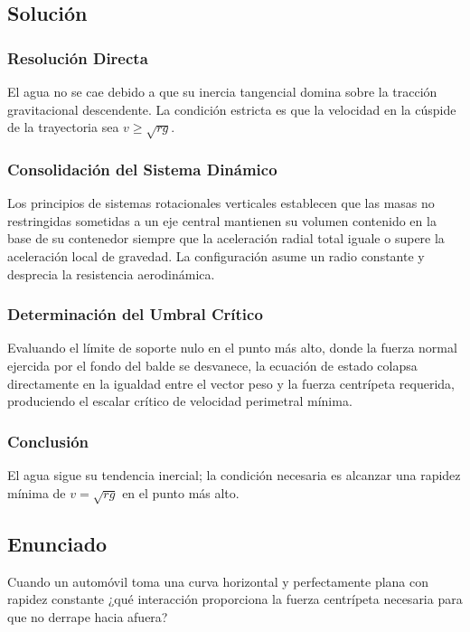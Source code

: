 \documentclass{article}
\begin{document}
\subsection*{Solución}

\subsubsection*{Resolución Directa}
El agua no se cae debido a que su inercia tangencial domina sobre la tracción gravitacional descendente. La condición estricta es que la velocidad en la cúspide de la trayectoria sea $v \geq \sqrt{rg}$.

\subsubsection*{Consolidación del Sistema Dinámico}
Los principios de sistemas rotacionales verticales establecen que las masas no restringidas sometidas a un eje central mantienen su volumen contenido en la base de su contenedor siempre que la aceleración radial total iguale o supere la aceleración local de gravedad. La configuración asume un radio constante y desprecia la resistencia aerodinámica.

\subsubsection*{Determinación del Umbral Crítico}
Evaluando el límite de soporte nulo en el punto más alto, donde la fuerza normal ejercida por el fondo del balde se desvanece, la ecuación de estado colapsa directamente en la igualdad entre el vector peso y la fuerza centrípeta requerida, produciendo el escalar crítico de velocidad perimetral mínima.

\subsubsection*{Conclusión}
El agua sigue su tendencia inercial; la condición necesaria es alcanzar una rapidez mínima de $v = \sqrt{rg}$ en el punto más alto.

\newpage

\subsection*{Enunciado}
Cuando un automóvil toma una curva horizontal y perfectamente plana con rapidez constante ¿qué interacción proporciona la fuerza centrípeta necesaria para que no derrape hacia afuera?
\end{document}
